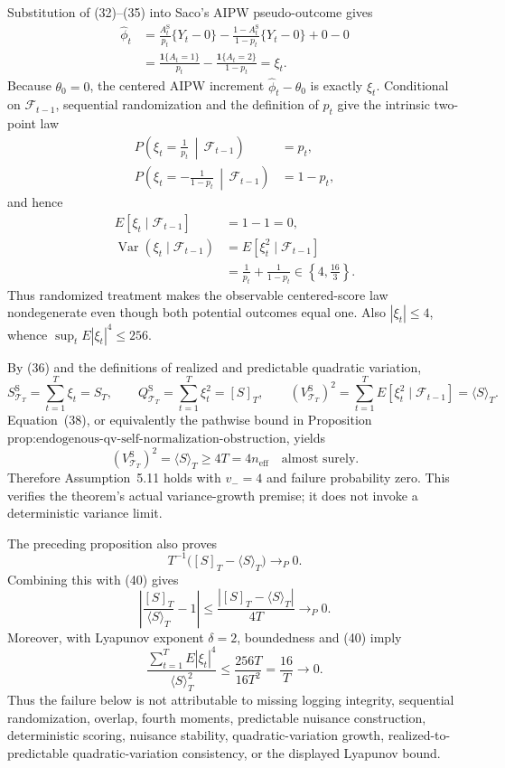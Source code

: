 Substitution of (32)--(35) into Saco's AIPW pseudo-outcome gives
\[
 \begin{aligned}
 \widehat\phi_t
 &=\frac{A_t^{\mathrm S}}{p_t}\{Y_t-0\}
   -\frac{1-A_t^{\mathrm S}}{1-p_t}\{Y_t-0\}+0-0\\
 &=\frac{\mathbf1\{A_t=1\}}{p_t}
   -\frac{\mathbf1\{A_t=2\}}{1-p_t}
 =\xi_t.
 \end{aligned}
\tag{36}
\]
Because \(\theta_0=0\), the centered AIPW increment \(\widehat\phi_t-\theta_0\) is exactly \(\xi_t\).  Conditional on \(\mathcal F_{t-1}\), sequential randomization and the definition of \(p_t\) give the intrinsic two-point law
\[
 \begin{aligned}
 P\!\left(\xi_t=\frac1{p_t}\,\middle|\,\mathcal F_{t-1}\right)&=p_t,\\
 P\!\left(\xi_t=-\frac1{1-p_t}\,\middle|\,\mathcal F_{t-1}\right)&=1-p_t,
 \end{aligned}
\tag{37}
\]
and hence
\[
 \begin{aligned}
 E[\xi_t\mid\mathcal F_{t-1}]&=1-1=0,\\
 \operatorname{Var}(\xi_t\mid\mathcal F_{t-1})
 &=E[\xi_t^2\mid\mathcal F_{t-1}]\\
 &=\frac1{p_t}+\frac1{1-p_t}
 \in\left\{4,\frac{16}{3}\right\}.
 \end{aligned}
\tag{38}
\]
Thus randomized treatment makes the observable centered-score law nondegenerate even though both potential outcomes equal one.  Also \(|\xi_t|\le4\), whence \(\sup_tE|\xi_t|^4\le256\).

By (36) and the definitions of realized and predictable quadratic variation,
\[
 S_{\mathcal T_T}^{\mathrm S}=\sum_{t=1}^T\xi_t=S_T,
 \qquad
 Q_{\mathcal T_T}^{\mathrm S}=\sum_{t=1}^T\xi_t^2=[S]_T,
 \qquad
 (V_{\mathcal T_T}^{\mathrm S})^2
 =\sum_{t=1}^TE[\xi_t^2\mid\mathcal F_{t-1}]
 =\langle S\rangle_T.
\tag{39}
\]
Equation~(38), or equivalently the pathwise bound in Proposition~\(\text{prop:endogenous-qv-self-normalization-obstruction}\), yields
\[
 (V_{\mathcal T_T}^{\mathrm S})^2=\langle S\rangle_T\ge4T
 =4n_{\mathrm{eff}}
\quad\text{almost surely}.
\tag{40}
\]
Therefore Assumption~5.11 holds with \(v_-=4\) and failure probability zero.  This verifies the theorem's actual variance-growth premise; it does not invoke a deterministic variance limit.

The preceding proposition also proves
\[
 T^{-1}\bigl([S]_T-\langle S\rangle_T\bigr)\to_P0.
\]
Combining this with (40) gives
\[
 \left|\frac{[S]_T}{\langle S\rangle_T}-1\right|
 \le\frac{|[S]_T-\langle S\rangle_T|}{4T}
 \to_P0.
\tag{41}
\]
Moreover, with Lyapunov exponent \(\delta=2\), boundedness and (40) imply
\[
 \frac{\sum_{t=1}^TE|\xi_t|^4}{\langle S\rangle_T^2}
 \le\frac{256T}{16T^2}
 =\frac{16}{T}\longrightarrow0.
\tag{42}
\]
Thus the failure below is not attributable to missing logging integrity, sequential randomization, overlap, fourth moments, predictable nuisance construction, deterministic scoring, nuisance stability, quadratic-variation growth, realized-to-predictable quadratic-variation consistency, or the displayed Lyapunov bound.


